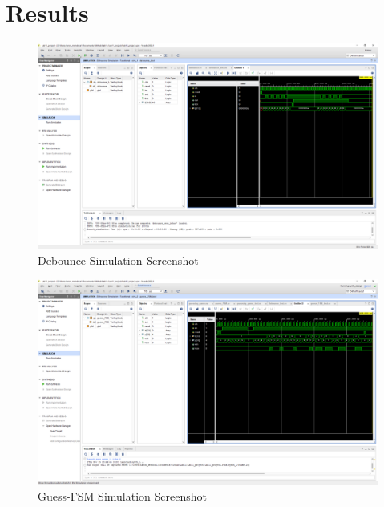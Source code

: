 \documentclass[11pt]{article}
\begin{document}
\section*{Results}

\begin{figure}[ht]\centering
	\includegraphics[width=1\textwidth,trim=32cm 20cm 0cm 4.5cm,clip]{debounce_test_screenshot}
	\caption{Debounce Simulation Screenshot}
	\label{fig:sim_with_table}
\end{figure}

\FloatBarrier

\begin{figure}[ht]\centering
	\includegraphics[width=1\textwidth,trim=26cm 18cm 0cm 4.5cm,clip]{guess_FSM_screenshot}
	\caption{Guess-FSM Simulation Screenshot}
	\label{fig:sim_with_table}
\end{figure}

\FloatBarrier
\end{document}

